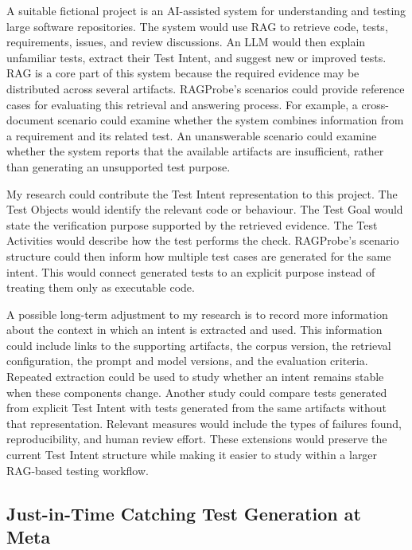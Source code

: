 A suitable fictional project is an AI-assisted system for understanding and testing large software repositories. The system would use RAG to retrieve code, tests, requirements, issues, and review discussions. An LLM would then explain unfamiliar tests, extract their Test Intent, and suggest new or improved tests. RAG is a core part of this system because the required evidence may be distributed across several artifacts. RAGProbe's scenarios could provide reference cases for evaluating this retrieval and answering process. For example, a cross-document scenario could examine whether the system combines information from a requirement and its related test. An unanswerable scenario could examine whether the system reports that the available artifacts are insufficient, rather than generating an unsupported test purpose.

My research could contribute the Test Intent representation to this project. The Test Objects would identify the relevant code or behaviour. The Test Goal would state the verification purpose supported by the retrieved evidence. The Test Activities would describe how the test performs the check. RAGProbe's scenario structure could then inform how multiple test cases are generated for the same intent. This would connect generated tests to an explicit purpose instead of treating them only as executable code.

A possible long-term adjustment to my research is to record more information about the context in which an intent is extracted and used. This information could include links to the supporting artifacts, the corpus version, the retrieval configuration, the prompt and model versions, and the evaluation criteria. Repeated extraction could be used to study whether an intent remains stable when these components change. Another study could compare tests generated from explicit Test Intent with tests generated from the same artifacts without that representation. Relevant measures would include the types of failures found, reproducibility, and human review effort. These extensions would preserve the current Test Intent structure while making it easier to study within a larger RAG-based testing workflow.

\subsection{Just-in-Time Catching Test Generation at Meta}

